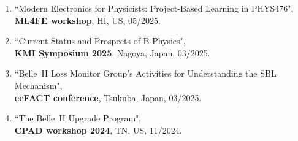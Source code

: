 \documentclass[11pt]{article}
\begin{document}
{\begin{enumerate}[itemsep=0pt]
\item {``Modern Electronics for Physicists: Project-Based Learning in PHYS476",\\ \textbf{ML4FE workshop}, HI, US, 05/2025.} 
\item {``Current Status and Prospects of B-Physics",\\ \textbf{KMI Symposium 2025}, Nagoya, Japan, 03/2025.} 
\item {``Belle~II Loss Monitor Group's Activities for Understanding the SBL Mechanism",\\ \textbf{eeFACT conference}, Tsukuba, Japan, 03/2025.} 
\item {``The Belle~II Upgrade Program",\\ \textbf{CPAD workshop 2024}, TN, US, 11/2024.} 
\end{enumerate}
}
\end{document}
